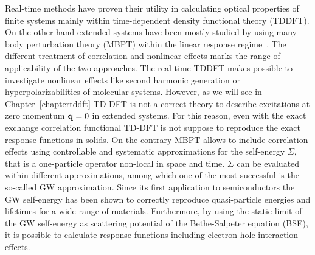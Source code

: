 Real-time methods have proven their utility in calculating optical properties of finite systems mainly within time-dependent density functional
theory (TDDFT).\cite{PhysRevB.62.7998,PSSB:PSSB200642067,sun:234107} On the other hand extended systems have been mostly studied by using many-body  perturbation
theory (MBPT) within the linear response regime~\cite{strinati}. 
The different treatment of correlation and nonlinear effects marks the range of applicability of the two approaches. The real-time TDDFT makes
possible to investigate nonlinear effects like second harmonic generation\cite{takimoto:154114} or hyperpolarizabilities of 
molecular systems\cite{PSSB:PSSB200642067}.
However, as we will see in Chapter~\ref{chaptertddft} TD-DFT is not a correct theory to describe excitations at zero momentum ${\bf q}=0$ in extended systems.
For this reason, even with the exact exchange correlation functional TD-DFT is not suppose to reproduce the exact response functions in solids.
On the contrary MBPT allows to include correlation effects using controllable and systematic approximations for the self-energy $\Sigma$,
that is a one-particle operator non-local in space and time.
$\Sigma$ can be evaluated within different approximations, among which one of the most successful is the so-called GW
approximation\cite{Aulbur19991}.
Since its first application to semiconductors\cite{PhysRevLett.45.290} the GW self-energy has been shown to
correctly reproduce quasi-particle energies and lifetimes for a wide range of materials\cite{Aulbur19991,faber2013many}.
Furthermore, by using the static limit of the GW self-energy as scattering potential of the
Bethe-Salpeter equation (BSE)\cite{strinati}, it is possible to calculate response functions including electron-hole interaction
effects.

